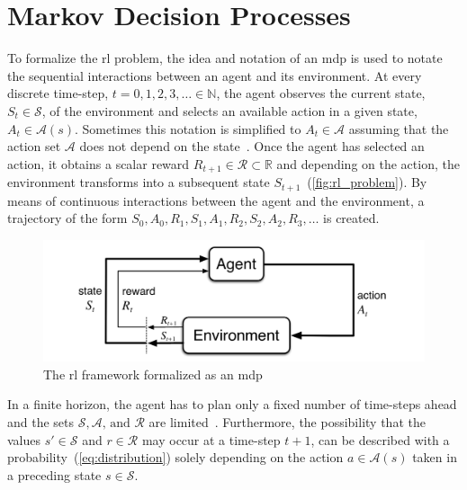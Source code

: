\documentclass[draft,final]{vutinfth} %
\newcommand{\pautoref}[1]{(\autoref{#1})}
\newcommand{\p}[1]{see p. #1}
\begin{document}
    \section{Markov Decision Processes}\label{sec:markov-decision-processes}
    To formalize the \gls{rl} problem, the idea and notation of an \gls{mdp} is used to notate the sequential interactions between an agent and its environment.
    At every discrete time-step, $t = 0,1,2,3, \ldots \in \mathbb{N}$, the agent observes the current state, $S_t \in \mathcal{S}$, of the environment and selects an available action in a given state, $A_t \in \mathcal{A}(s)$.
    Sometimes this notation is simplified to $A_t \in \mathcal{A}$ assuming that the action set $\mathcal{A}$ does not depend on the state~\citep[\p{48}]{sutton_reinforcement_2018}.
    Once the agent has selected an action, it obtains a scalar reward $R_{t+1} \in \mathcal{R} \subset \mathbb{R}$ and depending on the action, the environment transforms into a subsequent state $S_{t+1}$~\pautoref{fig:rl_problem}.
    By means of continuous interactions between the agent and the environment, a trajectory of the form $S_0,A_0,R_1,S_1,A_1,R_2,S_2,A_2,R_3,\ldots$ is created.

    \begin{figure}[h]
        \centering
        \includegraphics[width=\textwidth]{figures/rl_problem.png}
        \caption[The \acrlong{rl} framework formalized as a \acrlong{mdp}]{The \gls{rl} framework formalized as an \gls{mdp}\protect\footnotemark}
        \label{fig:rl_problem}
    \end{figure}

    \footnotetext{\cite[\p{48}]{sutton_reinforcement_2018}}

    In a finite horizon, the agent has to plan only a fixed number of time-steps ahead and the sets $\mathcal{S},\mathcal{A}\text{, and }\mathcal{R}$ are limited~\citep[\p{47f}]{sutton_reinforcement_2018,kaelbling_reinforcement_1996}.
    Furthermore, the possibility that the values $s'\in \mathcal{S}$ and $r \in \mathcal{R}$ may occur at a time-step $t+1$, can be described with a probability~\pautoref{eq:distribution} solely depending on the action $a \in \mathcal{A}(s)$ taken in a preceding state $s \in \mathcal{S}$.
\end{document}

